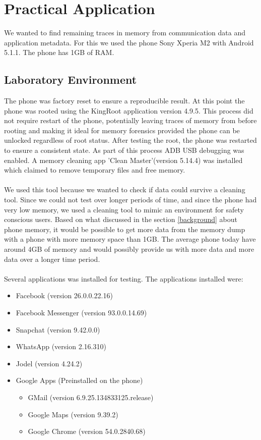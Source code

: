 \section{Practical Application}
We wanted to find remaining traces in memory from communication data and application metadata. For this we used the phone Sony Xperia M2 with Android 5.1.1. The phone has 1GB of RAM.

\subsection{Laboratory Environment}
The phone was factory reset to ensure a reproducible result. At this point the phone was rooted using the KingRoot application version 4.9.5. This process did not require restart of the phone, potentially leaving traces of memory from before rooting and making it ideal for memory forensics provided the phone can be unlocked regardless of root status. After testing the root, the phone was restarted to ensure a consistent state. As part of this process ADB USB debugging was enabled. A memory cleaning app 'Clean Master'(version 5.14.4) was installed which claimed to remove temporary files and free memory.\\\\ %
We used this tool because we wanted to check if data could survive a cleaning tool. Since we could not test over longer periods of time, and since the phone had very low memory, we used a cleaning tool to mimic an environment for safety conscious users. Based on what discussed in the section \ref{background} about phone memory, it would be possible to get more data from the memory dump with a phone with more memory space than 1GB. The average phone today have around 4GB of memory and would possibly provide us with more data and more data over a longer time period.\\\\Several applications was installed for testing. The applications installed were:
\begin{description}
\begin{itemize}
\item{Facebook (version 26.0.0.22.16)}
\item{Facebook Messenger (version 93.0.0.14.69)}
\item{Snapchat (version 9.42.0.0)}
\item{WhatsApp (version 2.16.310)}
\item{Jodel (version 4.24.2)}
\item{Google Apps (Preinstalled on the phone)}
\begin{itemize}
\item{GMail (version 6.9.25.134833125.release)}
\item{Google Maps (version 9.39.2)}
\item{Google Chrome (version 54.0.2840.68)}
\end{itemize}
\end{itemize}
\end{description}
